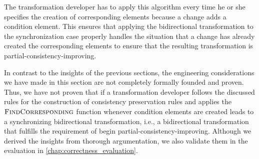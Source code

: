 The transformation developer has to apply this algorithm every time he or she specifies the creation of corresponding elements because a change adds a condition element.
This ensures that applying the bidirectional transformation to the synchronization case properly handles the situation that a change has already created the corresponding elements to ensure that the resulting transformation is partial-consistency-improving.

In contrast to the insights of the previous sections, the engineering considerations we have made in this section are not completely formally founded and proven.
Thus, we have not proven that if a transformation developer follows the discussed rules for the construction of consistency preservation rules and applies the $\textsc{FindCorresponding}$ function whenever condition elements are created leads to a synchronizing bidirectional transformation, i.e., a bidirectional transformation that fulfills the requirement of begin partial-consistency-improving.
Although we derived the insights from thorough argumentation, we also validate them in the evaluation in \autoref{chap:correctness_evaluation}.




